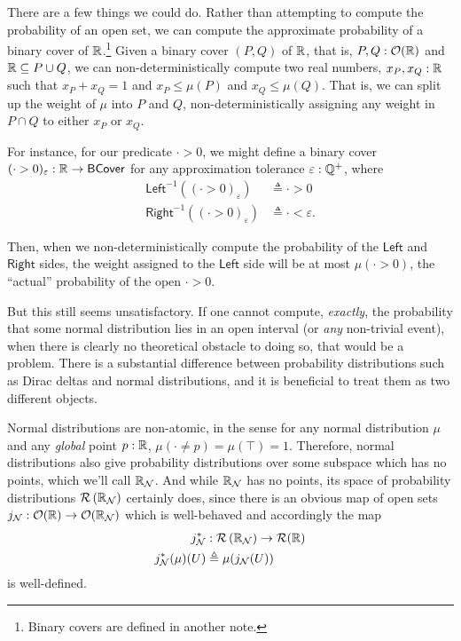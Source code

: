 There are a few things we could do. Rather than attempting to compute the probability of an open set, we can compute the approximate probability of a binary cover of $\mathbb{R}$.\footnote{Binary covers are defined in another note.} Given a binary cover $(P, Q)$ of $\mathbb{R}$, that is, $P, Q : \mathcal{O}({\mathbb{R}})$ and $\mathbb{R} \subseteq P \cup Q$, we can non-deterministically compute two real numbers, $x_P, x_Q : \mathbb{R}$ such that $x_P + x_Q = 1$ and $x_P \le \mu(P)$ and $x_Q \le \mu(Q)$. That is, we can split up the weight of $\mu$ into $P$ and $Q$, non-deterministically assigning any weight in $P \cap Q$ to either $x_P$ or $x_Q$.

For instance, for our predicate $\cdot > 0$, we might define a binary cover $(\cdot > 0)_\varepsilon : \mathbb{R} \to \mathsf{BCover}$ for any approximation tolerance $\varepsilon : \mathbb{Q}^+$, where
\begin{align*}
\mathsf{Left}^{-1}((\cdot > 0)_\varepsilon) &\triangleq \cdot > 0
\\ \mathsf{Right}^{-1}((\cdot > 0)_\varepsilon) &\triangleq \cdot < \varepsilon.
\end{align*}

Then, when we non-deterministically compute the probability of the $\mathsf{Left}$ and $\mathsf{Right}$ sides, the weight assigned to the $\mathsf{Left}$ side will be at most $\mu(\cdot > 0)$, the ``actual'' probability of the open $\cdot > 0$.

But this still seems unsatisfactory. If one cannot compute, \emph{exactly}, the probability that some normal distribution lies in an open interval (or \emph{any} non-trivial event), when there is clearly no theoretical obstacle to doing so, that would be a problem. There is a substantial difference between probability distributions such as Dirac deltas and normal distributions, and it is beneficial to treat them as two different objects.

Normal distributions are non-atomic, in the sense for any normal distribution $\mu$ and any \emph{global} point $p : \mathbb{R}$, $\mu(\cdot \neq p) = \mu(\top) = 1$. Therefore, normal distributions also give probability distributions over some subspace which has no points, which we'll call $\mathbb{R}_\mathcal{N}$. And while $\mathbb{R}_\mathcal{N}$ has no points, its space of probability distributions $\mathcal{R}\left(\mathbb{R}_\mathcal{N}\right)$ certainly does, since there is an obvious map of open sets $j_\mathcal{N} : \mathcal{O}({\mathbb{R}}) \to \mathcal{O}({\mathbb{R}_\mathcal{N}})$ which is well-behaved and accordingly the map
\begin{align*}
j_\mathcal{N}^* &: \mathcal{R}\left(\mathbb{R}_\mathcal{N}\right) \to \mathcal{R}(\mathbb{R})
\\ j_\mathcal{N}^*(\mu)(U) &\triangleq \mu(j_\mathcal{N}(U))
\end{align*}
is well-defined.

